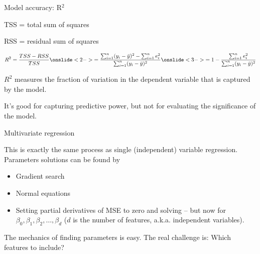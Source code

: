 \documentclass[aspectratio=169]{beamer}
\begin{document}
\begin{frame}{Model accuracy: R$^2$}

TSS = total sum of squares

\vspace{3mm}

RSS = residual sum of squares

  \begin{align*}
    R^2 = \frac{TSS - RSS}{TSS} \onslide<2->{= \frac{\sum_{i=1}^n (y_i-\bar{y})^2 - \sum_{i=1}^n e_i^2}{\sum_{i=1}^n (y_i-\bar{y})^2}}\onslide<3->{ = 1-\frac{\sum_{i=1}^n e_i^2}{\sum_{i=1}^n (y_i-\bar{y})^2} }
  \end{align*}

  \pause\pause
  $R^2$ measures the fraction of variation in the dependent variable that is captured by the model.  

\pause
\vspace{5mm}

It's good for capturing predictive power, but not for evaluating the significance of the model.

\end{frame}

\begin{frame}{Multivariate regression}

This is exactly the same process as single (independent) variable regression.  Parameters solutions can be found by
\begin{itemize}
\item Gradient search
\item Normal equations
\item Setting partial derivatives of MSE to zero and solving -- but now for $\beta_0, \beta_1, \beta_2,\ldots,\beta_d$ ($d$ is the number of features, a.k.a. independent variables).
\end{itemize}

\vspace{5mm}
The mechanics of finding parameters is easy.  The real challenge is: Which features to include?
\end{frame}
\end{document}
